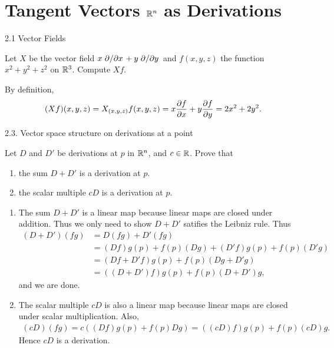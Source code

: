 \section{Tangent Vectors $\mathbb{R}^n$ as Derivations}

\begin{problem}{2.1 Vector Fields}

    Let $X$ be the vector field $x\pdv*{x} + y\pdv*{y}$ and $f(x, y, z)$ the function $x^2 + y^2 + z^2$ on $\mathbb{R}^3$.
    Compute $Xf$.
\end{problem}

By definition, 
\begin{equation}
    (Xf)(x, y, z) = X_{(x, y, z)} f(x, y, z) = x \pdv{f}{x} (x, y, z) + y \pdv{f}{y} (x, y, z) = 2x^2 + 2y^2 .
\end{equation}

\begin{problem}{2.3. Vector space structure on derivations at a point}

    Let $D$ and $D'$ be derivations at $p$ in $\mathbb{R}^n$, and $c \in \mathbb{R}$. Prove that
\begin{enumerate}[label=(\alph*)]
    \item the sum $D + D'$ is a derivation at $p$.
    \item the scalar multiple $cD$ is a derivation at $p$.
\end{enumerate}
\end{problem}

\begin{enumerate}[label=(\alph*)]
    \item The sum $D + D'$ is a linear map because linear maps are closed under addition. 
    Thus we only need to show $D + D'$ satifies the Leibniz rule. Thus 
    \begin{align}
        (D + D')(fg) &= D(fg) + D'(fg) \\
        &= (Df) g(p) + f(p)(Dg) + (D'f) g(p) + f(p) (D'g) \\ 
        &= (Df + D'f)g(p) + f(p)(Dg + D'g) \\ 
        &= ( (D + D')f ) g(p) + f(p) (D + D')g,
    \end{align}
    and we are done.

    \item The scalar multiple $cD$ is also a linear map because linear maps are closed under scalar 
    multiplication. Also,
    \begin{align}
        (cD)(fg) = c((Df)g(p) + f(p)Dg) = ((cD)f) g(p) + f(p) (cD)g .
    \end{align}
    Hence $cD$ is a derivation.
\end{enumerate}

